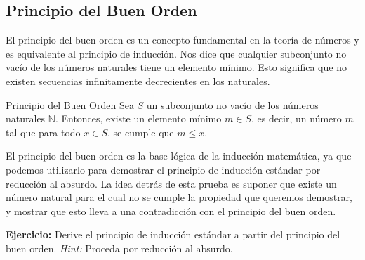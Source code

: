     

\subsection{Principio del Buen Orden}

El principio del buen orden es un concepto fundamental en la teoría de números y es equivalente al principio de inducción. Nos dice que cualquier subconjunto no vacío de los números naturales tiene un elemento mínimo. Esto significa que no existen secuencias infinitamente decrecientes en los naturales.

\begin{definitionblock}{Principio del Buen Orden}
Sea \( S \) un subconjunto no vacío de los números naturales \( \mathbb{N} \). Entonces, existe un elemento mínimo \( m \in S \), es decir, un número \( m \) tal que para todo \( x \in S \), se cumple que \( m \leq x \).
\end{definitionblock}

El principio del buen orden es la base lógica de la inducción matemática, ya que podemos utilizarlo para demostrar el principio de inducción estándar por reducción al absurdo. La idea detrás de esta prueba es suponer que existe un número natural para el cual no se cumple la propiedad que queremos demostrar, y mostrar que esto lleva a una contradicción con el principio del buen orden.

\medskip
\medskip

\textbf{Ejercicio:} Derive el principio de inducción estándar a partir del principio del buen orden. \textit{Hint:} Proceda por reducción al absurdo.



